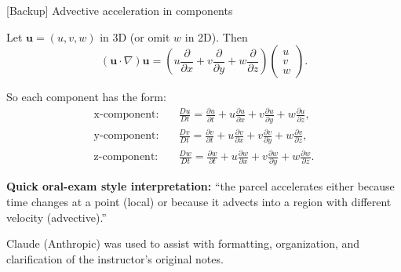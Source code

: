 \documentclass[aspectratio=169,11pt]{beamer}
\begin{document}
\begin{frame}{[Backup] Advective acceleration in components}
\footnotesize

Let $\mathbf{u}=(u,v,w)$ in 3D (or omit $w$ in 2D). Then
\[
(\mathbf{u}\cdot\nabla)\mathbf{u}
=
\left(u\frac{\partial}{\partial x}+v\frac{\partial}{\partial y}+w\frac{\partial}{\partial z}\right)
\begin{pmatrix}u\\v\\w\end{pmatrix}.
\]

\medskip
So each component has the form:
\[
\begin{aligned}
\text{x-component:}\quad
&\frac{Du}{Dt}=\frac{\partial u}{\partial t} + u\frac{\partial u}{\partial x}+v\frac{\partial u}{\partial y}+w\frac{\partial u}{\partial z},\\[3pt]
\text{y-component:}\quad
&\frac{Dv}{Dt}=\frac{\partial v}{\partial t} + u\frac{\partial v}{\partial x}+v\frac{\partial v}{\partial y}+w\frac{\partial v}{\partial z},\\[3pt]
\text{z-component:}\quad
&\frac{Dw}{Dt}=\frac{\partial w}{\partial t} + u\frac{\partial w}{\partial x}+v\frac{\partial w}{\partial y}+w\frac{\partial w}{\partial z}.
\end{aligned}
\]

\medskip
\textbf{Quick oral-exam style interpretation:}
``the parcel accelerates either because time changes at a point (local) or because it advects into a region
with different velocity (advective).''

\vfill
{\tiny\color{black!55}Claude (Anthropic) was used to assist with formatting, organization, and clarification of the instructor's original notes.}

\end{frame}
\end{document}
